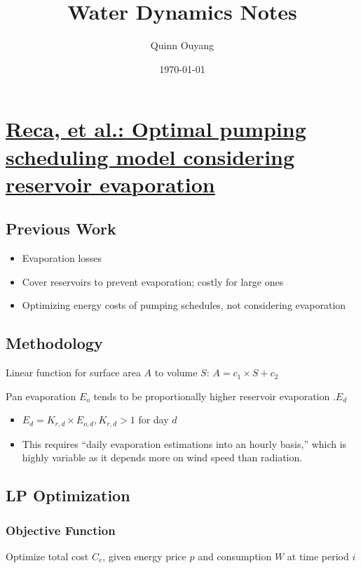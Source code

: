 \documentclass{article}
\title{Water Dynamics Notes}
\author{Quinn Ouyang}
\date{\today}
\begin{document}
\maketitle

\section{\href{https://doi.org/10.1016/j.agwat.2014.10.008}{Reca, et al.: Optimal pumping scheduling model considering reservoir evaporation}}

\subsection{Previous Work}

\begin{itemize}
    \item Evaporation losses
    \item Cover reservoirs to prevent evaporation; costly for large ones
    \item Optimizing energy costs of pumping schedules, not considering evaporation
\end{itemize}

\subsection{Methodology}

Linear function for surface area $A$ to volume $S$: $A = c_1 \times S + c_2$

Pan evaporation $E_{o}$ tends to be proportionally higher reservoir evaporation .$E_d$
\begin{itemize}
    \item $E_d = K_{r, d} \times E_{o,d}, K_{r, d} >1$ for day $d$
    \item This requires “daily evaporation estimations into an hourly basis,” which is highly variable as it depends more on wind speed than radiation.
\end{itemize}

\subsection{LP Optimization}

\subsubsection{Objective Function}

Optimize total cost $C_e$, given energy price $p$ and consumption $W$ at time period $i$
\end{document}
